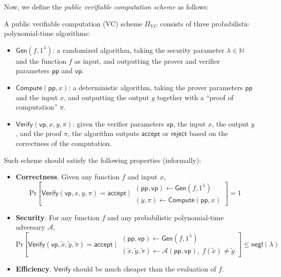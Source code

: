 \documentclass{iacrtrans}
\begin{document}
Now, we define the \textit{public verifiable computation scheme} as follows:
\begin{definition}
  A public verifiable computation (VC) scheme $\Pi_{\text{VC}}$ consists of three probabilistic polynomial-time algorithms:
  \begin{itemize}
    \item $\mathsf{Gen}(f,1^{\lambda})$: a randomized algorithm, taking the security parameter $\lambda \in \mathbb{N}$ and the function $f$ as input, and outputting the prover and verifier parameters $\mathsf{pp}$ and $\mathsf{vp}$.
    \item $\mathsf{Compute}(\mathsf{pp}, x)$: a deterministic algorithm, taking the prover parameters $\mathsf{pp}$ and the input $x$, and outputting the output $y$ together with a ``proof of computation'' $\pi$.
    \item $\mathsf{Verify}(\mathsf{vp}, x, y, \pi)$: given the verifier parameters $\mathsf{vp}$, the input $x$, the output $y$, and the proof $\pi$, the algorithm outputs $\mathsf{accept}$ or $\mathsf{reject}$ based on the correctness of the computation.
  \end{itemize}

  Such scheme should satisfy the following properties (informally):
  \begin{itemize}
    \item \textbf{Correctness}. Given any function $f$ and input $x$,
    \begin{equation*}
      \text{Pr}\left[\mathsf{Verify}(\mathsf{vp}, x, y, \pi) = \mathsf{accept}\; \Big| \; \begin{matrix}
        (\mathsf{pp},\mathsf{vp}) \gets \mathsf{Gen}(f,1^{\lambda}) \\
        (y,\pi) \gets \mathsf{Compute}(\mathsf{pp},x)
      \end{matrix}\right] = 1
    \end{equation*}
    \item \textbf{Security}. For any function $f$ and any probabilistic polynomial-time adversary $\mathcal{A}$, 
    \begin{equation*}
      \text{Pr}\left[\mathsf{Verify}(\mathsf{vp}, \widetilde{x}, \widetilde{y}, \widetilde{\pi}) = \mathsf{accept}\; \Big| \; \begin{matrix}
        (\mathsf{pp},\mathsf{vp}) \gets \mathsf{Gen}(f,1^{\lambda}) \\
        (\widetilde{x}, \widetilde{y}, \widetilde{\pi}) \gets \mathcal{A}(\mathsf{pp}, \mathsf{vp}), \; f(\widetilde{x}) \neq \widetilde{y}
      \end{matrix}\right] \leq \mathsf{negl}(\lambda)
    \end{equation*}
    \item \textbf{Efficiency}. $\mathsf{Verify}$ should be much cheaper than the evaluation of $f$.
  \end{itemize}
\end{definition}
\end{document}
